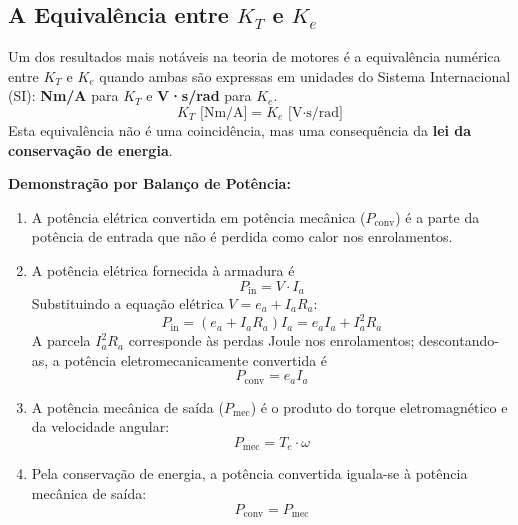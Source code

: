 \subsection{A Equivalência entre $K_T$ e $K_e$}

Um dos resultados mais notáveis na teoria de motores é a equivalência numérica entre $K_T$ e $K_e$ quando ambas são expressas em unidades do Sistema Internacional (SI): \textbf{Nm/A} para $K_T$ e \textbf{V·s/rad} para $K_e$.
\begin{equation}
    K_T \text{ [Nm/A]} = K_e \text{ [V·s/rad]}
\end{equation}
Esta equivalência não é uma coincidência, mas uma consequência da \textbf{lei da conservação de energia}.

\textbf{Demonstração por Balanço de Potência:}
\begin{enumerate}
    \item A potência elétrica convertida em potência mecânica ($P_{\text{conv}}$) é a parte da potência de entrada que não é perdida como calor nos enrolamentos.

    \item A potência elétrica fornecida à armadura é
    \begin{equation}
        P_{\text{in}} = V \cdot I_a
    \end{equation}
    Substituindo a equação elétrica $V = e_a + I_a R_a$:
    \begin{equation}
        P_{\text{in}} = (e_a + I_a R_a) I_a = e_a I_a + I_a^2 R_a
    \end{equation}
    A parcela $I_a^2 R_a$ corresponde às perdas Joule nos enrolamentos; descontando-as, a potência eletromecanicamente convertida é
    \begin{equation}
        P_{\text{conv}} = e_a I_a
    \end{equation}

    \item A potência mecânica de saída ($P_{\text{mec}}$) é o produto do torque eletromagnético e da velocidade angular:
    \begin{equation}
        P_{\text{mec}} = T_e \cdot \omega
    \end{equation}

    \item Pela conservação de energia, a potência convertida iguala-se à potência mecânica de saída:
    \begin{equation}
        P_{\text{conv}} = P_{\text{mec}}
    \end{equation}


\end{enumerate}
